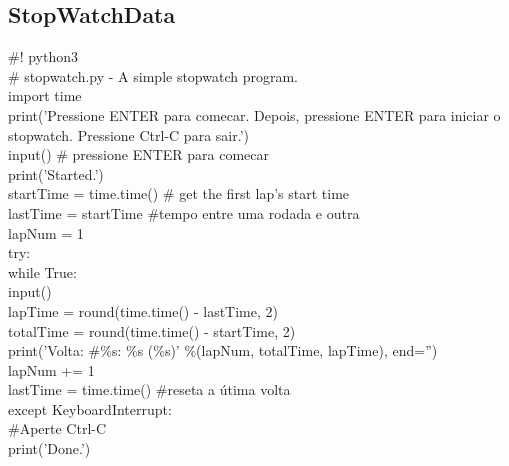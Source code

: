 \documentclass[12pt, a4paper]{article}
\begin{document}
\subsection{StopWatchData}
\#! python3\\
\# stopwatch.py - A simple stopwatch program.\\
import time\\
print('Pressione ENTER para comecar. Depois, pressione ENTER para iniciar o stopwatch. Pressione Ctrl-C para sair.')\\
input() \# pressione ENTER para comecar\\
print('Started.')\\
startTime = time.time() \# get the first lap's start time\\
lastTime = startTime   \#tempo entre uma rodada e outra\\
lapNum = 1\\
try:\\
while True:\\
input()\\
lapTime = round(time.time() - lastTime, 2)\\
totalTime = round(time.time() - startTime, 2)\\
print('Volta: \#\%s: \%s (\%s)' \%(lapNum, totalTime, lapTime), end='')\\
lapNum += 1\\
lastTime = time.time()  \#reseta a útima volta\\
except KeyboardInterrupt:\\
\#Aperte Ctrl-C\\
print('Done.')\\
\end{document}
